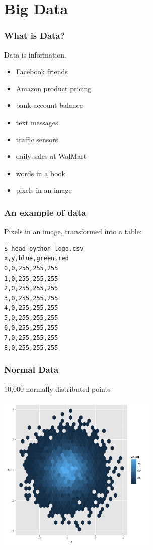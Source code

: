 \documentclass{beamer}
\begin{document}
\section{Big Data}
\begin{frame}

\frametitle{What is Data?}

Data is information.

\begin{itemize}
\item Facebook friends
\item Amazon product pricing
\item bank account balance
\item text messages
\item traffic sensors
\item daily sales at WalMart
\item words in a book
\item pixels in an image
\end{itemize}


\end{frame}
\begin{frame}[fragile]


\frametitle{An example of data}

Pixels in an image, transformed into a table:

\begin{verbatim}
$ head python_logo.csv
x,y,blue,green,red
0,0,255,255,255
1,0,255,255,255
2,0,255,255,255
3,0,255,255,255
4,0,255,255,255
5,0,255,255,255
6,0,255,255,255
7,0,255,255,255
8,0,255,255,255
\end{verbatim}


\end{frame}
\begin{frame}


\frametitle{Normal Data}

10,000 normally distributed points

\centerline{\includegraphics[height=3in]{normal.pdf}}


\end{frame}
\end{document}
